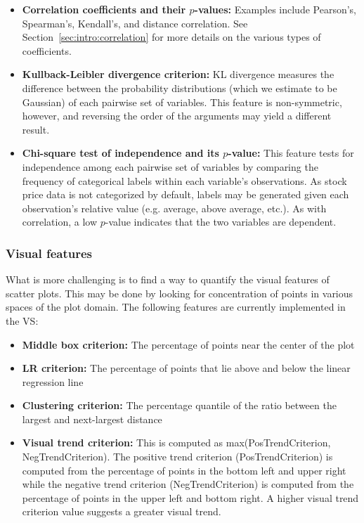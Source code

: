 \tablespacing
\begin{itemize}
	\item \textbf{Correlation coefficients and their $p$-values:} Examples 
	include Pearson's, Spearman's, Kendall's, and distance correlation. See 
	Section~\ref{sec:intro:correlation} for more details on the various types 
	of coefficients.
	\item \textbf{Kullback-Leibler divergence criterion:} KL divergence 
	measures the difference between the probability distributions (which we 
	estimate to be Gaussian) of each pairwise set of variables. This feature is 
	non-symmetric, however, and reversing the order of the arguments 
	may yield a different result.
	\item \textbf{Chi-square test of independence and its $p$-value:} This 
	feature tests for independence among each pairwise set of variables 
	by comparing the frequency of categorical labels within each variable's 
	observations. As stock price data is not categorized by default, labels may 
	be generated given each observation's relative value (e.g. average, above 
	average, etc.). As with correlation, a low $p$-value indicates that 
	the two variables are dependent.
\end{itemize}
\bodyspacing 

\subsubsection{Visual features}

What is more challenging is to find a way to quantify the visual features of 
scatter plots. This may be done by looking for concentration of points in 
various spaces of the plot domain. The following features are currently 
implemented in the VS: 

\tablespacing
\begin{itemize}
	\item \textbf{Middle box criterion:} The percentage of points near the 
	center of the plot
	\item \textbf{LR criterion:} The percentage of points that lie above and 
	below the linear regression line
	\item \textbf{Clustering criterion:} The percentage quantile of the ratio 
	between the largest and next-largest distance
	\item \textbf{Visual trend criterion:} This is computed as 
	max(PosTrendCriterion, NegTrendCriterion). The positive trend criterion 
	(PosTrendCriterion) is computed from the percentage of points in the bottom 
	left and upper right while the negative trend criterion (NegTrendCriterion) 
	is computed from the percentage of points in the upper left and 
	bottom right. A higher visual trend criterion value suggests a greater 
	visual trend. 
\end{itemize}
\bodyspacing